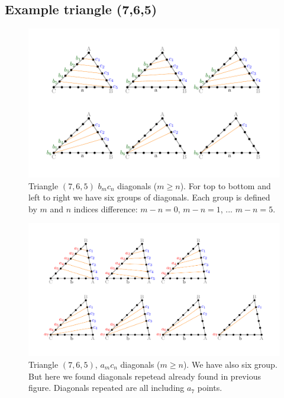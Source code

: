 \documentclass[11pt]{article}
\begin{document}
\subsection{Example triangle (7,6,5)}

\begin{figure}[htp]
\centering
\includegraphics[scale=1]{t765bc}
\caption{Triangle $(7,6,5)$ $b_mc_n$ diagonals ($m \ge n$).
For top to bottom and left to right we have six groups of diagonals.
Each group is defined by $m$ and $n$ indices difference:
$m - n = 0$, $m - n = 1$, ... $m - n = 5$.
}
\label{t765bc}
\end{figure}

\begin{figure}[htp]
\centering
\includegraphics[scale=1]{t765ac}
\caption{Triangle $(7,6,5)$, $a_mc_n$ diagonals ($m \ge n$).
We have also six group. But here we found diagonals repetead already
found in previous figure. Diagonals repeated are all including $a_7$ points.
}
\label{t765ac}
\end{figure}
\end{document}
